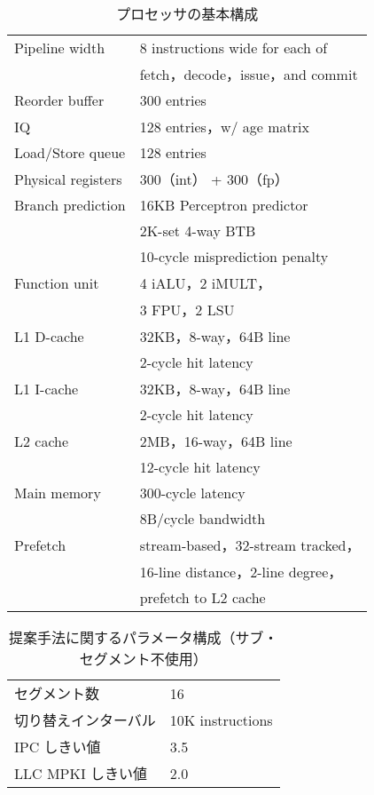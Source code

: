 \begin{table}[htb]
  \caption{プロセッサの基本構成}
  \footnotesize
  \center
    \begin{tabular}{l|l} \hline \hline
     Pipeline width & 8 instructions wide for each of \\
     & fetch，decode，issue，and commit \\
     Reorder buffer & 300 entries \\
     IQ & 128 entries，w/ age matrix \\
     Load/Store queue & 128 entries \\
     Physical registers & 300（int） + 300（fp） \\
     Branch prediction & 16KB Perceptron predictor~\cite{Jimenez2001} \\
     & 2K-set 4-way BTB \\
     & 10-cycle misprediction penalty \\
     Function unit & 4 iALU，2 iMULT，\\
     &  3 FPU，2 LSU \\
     L1 D-cache & 32KB，8-way，64B line \\
      & 2-cycle hit latency \\
     L1 I-cache & 32KB，8-way，64B line \\
      &  2-cycle hit latency \\
     L2 cache & 2MB，16-way，64B line \\
      & 12-cycle hit latency \\  
     Main memory & 300-cycle latency \\
     & 8B/cycle bandwidth \\ 
     Prefetch & stream-based，32-stream tracked， \\ 
     & 16-line distance，2-line degree，\\
     & prefetch to L2 cache \\ \hline
  \end{tabular}
  \label{tab:base_config}
\end{table}

\begin{table}[tb]
  \caption{提案手法に関するパラメータ構成（サブ・セグメント不使用）}
  \footnotesize
  \center
    \begin{tabular}{l|l} \hline \hline
    セグメント数 & 16 \\
    切り替えインターバル & 10K instructions \\
    IPC しきい値 & 3.5 \\
    LLC MPKI しきい値 & 2.0 \\ \hline 
  \end{tabular}
  \label{tab:switch_config}
\end{table}

